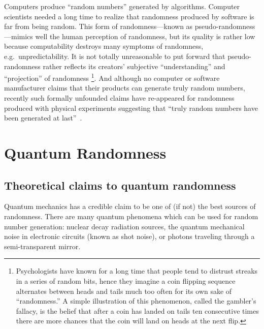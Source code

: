 \documentclass{mscs}
\begin{document}
Computers produce ``random numbers'' generated by algorithms.
Computer scientists needed a long time to realize that randomness produced by software is  far from being random.
This form of randomness---known as pseudo-randomness---mimics well the human perception of randomness, but its quality is rather low because computability destroys many symptoms of randomness,
e.g.\ unpredictability.
It is not totally unreasonable to put forward that pseudo-randomness rather reflects its creators' subjective ``understanding'' and ``projection''  of randomness \footnote{Psychologists have known for a long time that people tend to distrust streaks in a series of random bits,
hence they imagine a coin flipping sequence alternates between heads and tails much too often for its own sake of ``randomness.''
A simple illustration of this phenomenon, called the gambler's fallacy, is the belief that after a coin has landed on tails ten consecutive times there are more chances that the coin will land on heads at the next flip.}.
And although no computer or software manufacturer claims that their products can generate truly random numbers, recently such formally unfounded claims have re-appeared
for randomness produced with physical experiments
suggesting that ``truly random numbers have been generated at last''~\citep{randomDotOrg,Merali:2014aa}.

\section{Quantum Randomness}

\subsection{Theoretical claims to quantum randomness}

Quantum mechanics has a credible claim to be one of (if not) the best sources of randomness.
There are many quantum phenomena which can be used for random number generation: nuclear decay radiation sources,
the quantum mechanical noise in electronic circuits (known as shot noise), or photons traveling through a semi-transparent mirror.
\end{document}
